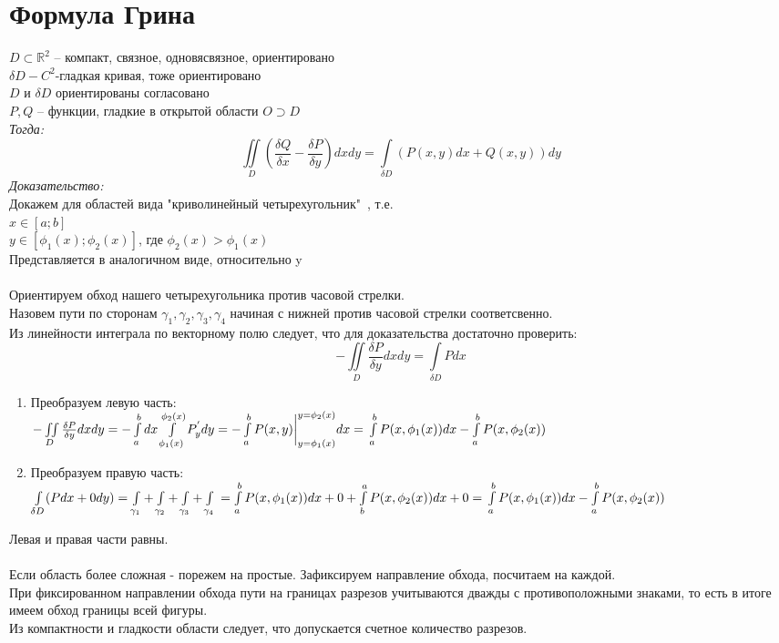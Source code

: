 \documentclass[paper=a4, fontsize=17pt]{article}
\begin{document}
\section{Формула Грина}
$D \subset \mathds{R}^2$ -- компакт, связное, одновясвязное, ориентировано\\$\delta D-C^2\text{-гладкая кривая, тоже ориентировано}$\\
$D$ и $\delta D$ ориентированы согласовано \\
$P, Q$ -- функции, гладкие в открытой области $O \supset D$ \\
\emph{Тогда:} $$\iint\limits_{D}(\frac{\delta Q}{\delta x} - \frac{\delta P}{\delta y})dxdy = \int\limits_{\delta D}(P(x,y)dx + Q(x,y))dy$$
\emph{Доказательство:} \\
Докажем для областей вида "криволинейный четырехугольник"\ , т.е. \\
$x \in [a;b]$ \\
$y \in [\phi_1(x);\phi_2(x)]$, где $\phi_2(x) > \phi_1(x)$ \\
Представляется в аналогичном виде, относительно y \\\\
Ориентируем обход нашего четырехугольника против часовой стрелки.\\
Назовем пути по сторонам $\gamma_1, \gamma_2, \gamma_3, \gamma_4$ начиная с нижней против часовой стрелки соответсвенно. \\
Из линейности интеграла по векторному полю следует, что для доказательства достаточно проверить: $$-\iint\limits_{D} \frac{\delta P}{\delta y}dxdy = \int\limits_{\delta D}Pdx$$ 
\begin{enumerate}
	\item Преобразуем левую часть:\\
		$-\iint\limits_{D} \frac{\delta P}{\delta y}dxdy = - \int\limits_{a}^bdx\int\limits_{\phi_1(x)}^{\phi_2(x)}P^{'}_ydy = -\int\limits_{a}^bP(x,y)\bigg|_{y=\phi_1(x)}^{y=\phi_2(x)}dx =\\ \int\limits_{a}^bP(x,\phi_1(x))dx - \int\limits_{a}^bP(x,\phi_2(x))$
	\item Преобразуем правую часть: \\
		$\int\limits_{\delta D}(Pdx + 0dy) = \int\limits_{\gamma_1}+\int\limits_{\gamma_2}+\int\limits_{\gamma_3}+\int\limits_{\gamma_4} \\ = \int\limits_{a}^bP(x,\phi_1(x))dx + 0 + \int\limits_{b}^aP(x, \phi_2(x))dx + 0 = \\ \int\limits_{a}^bP(x,\phi_1(x))dx - \int\limits_{a}^bP(x,\phi_2(x))$
\end{enumerate}
Левая и правая части равны. \\\\
Если область более сложная - порежем на простые. Зафиксируем направление обхода, посчитаем на каждой. \\
При фиксированном направлении обхода пути на границах разрезов учитываются дважды с противоположными знаками, то есть в итоге имеем обход границы всей фигуры.\\
Из компактности и гладкости области следует, что допускается счетное количество разрезов.
\end{document}

